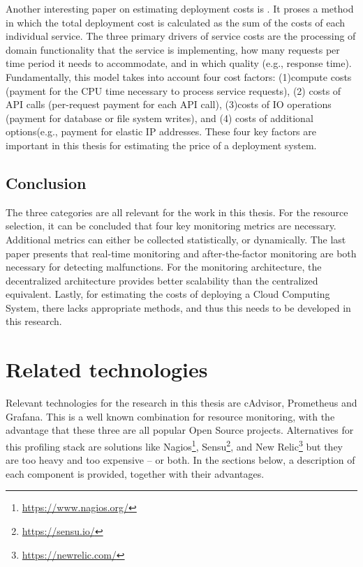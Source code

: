 \noindent
Another interesting paper on estimating deployment costs is \cite{leitner2016modelling}. It proses a method in which the total deployment cost is calculated as the sum of the costs of each individual service. The three primary drivers of service costs are the processing of domain functionality that the service is implementing, how many requests per time period it needs to accommodate, and in which quality (e.g., response time). Fundamentally, this model takes into account four cost factors: (1)compute costs (payment for the CPU time necessary to process service requests), (2) costs of API calls (per-request payment for each API call),  (3)costs of IO operations (payment for database or file system writes), and (4) costs of
additional options(e.g., payment for elastic IP addresses. These four key factors are important in this thesis for estimating the price of a deployment system.

\subsection{Conclusion} \label{sec:related_literature_conclusion}
The three categories are all relevant for the work in this thesis. For the resource selection, it can be concluded that four key monitoring metrics are necessary. Additional metrics can either be collected statistically, or dynamically. The last paper presents that real-time monitoring and after-the-factor monitoring are both necessary for detecting malfunctions. For the monitoring architecture, the decentralized architecture provides better scalability than the centralized equivalent. Lastly, for estimating the costs of deploying a Cloud Computing System, there lacks appropriate methods, and thus this needs to be developed in this research. 



\section{Related technologies} \label{sec:related_technologies}
Relevant technologies for the research in this thesis are cAdvisor, Prometheus and Grafana. This is a well known combination for resource monitoring, with the advantage that these three are all popular Open Source projects. Alternatives for this profiling stack are solutions like Nagios\footnote{\url{https://www.nagios.org/}}, Sensu\footnote{\url{https://sensu.io/}}, and New Relic\footnote{\url{https://newrelic.com/}} but they are too heavy and too expensive – or both. In the sections below, a description of each component is provided, together with their advantages.

